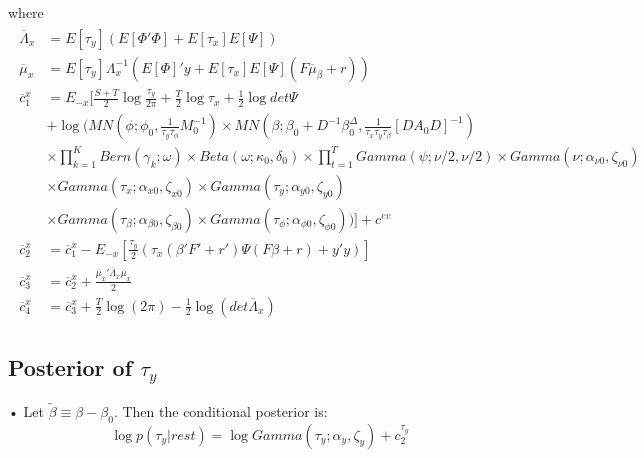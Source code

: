 \documentclass[11pt]{article}
\begin{document}
where
\begin{align*}
\begin{split}
	\overline{\Lambda}_{x}	&=	E\left[\tau_{y}\right]\left(E\left[\Phi'\Phi\right]+E\left[\tau_{x}\right]E\left[\Psi\right]\right)\\
	\overline{\mu}_{x}		&=	E\left[\tau_{y}\right]\Lambda_{x}^{-1}\left(E\left[\Phi\right]'y+E\left[\tau_{x}\right]E\left[\Psi\right]\left(F\overline{\mu}_{\beta}+r\right)\right)\\
	\overline{c}_{1}^{x}		&=	E_{-x}\Bigg[\frac{S+T}{2}\log\frac{\tau_{y}}{2\pi}+\frac{T}{2}\log\tau_{x}+\frac{1}{2}\log det\Psi\\
						&+\log\Bigg(MN\left(\phi;\phi_{0},\frac{1}{\tau_{y}\tau_{\phi}}M_{0}^{-1}\right)\times MN\left(\beta;\beta_{0}+D^{-1}\beta_{0}^{\Delta},\frac{1}{\tau_{x}\tau_{y}\tau_{\beta}}\left[DA_{0}D\right]^{-1}\right)\\
						&\times\prod_{k=1}^{K}Bern\left(\gamma_{k};\omega\right)\times Beta\left(\omega;\kappa_{0},\delta_{0}\right)\times\prod_{t=1}^{T}Gamma\left(\psi;\nu/2,\nu/2\right)\times Gamma\left(\nu;\alpha_{\nu0},\zeta_{\nu0}\right)\\
						&\times Gamma\left(\tau_{x};\alpha_{x0},\zeta_{x0}\right)\times Gamma\left(\tau_{y};\alpha_{y0},\zeta_{y0}\right)\\
						&\times Gamma\left(\tau_{\beta};\alpha_{\beta0},\zeta_{\beta0}\right)\times Gamma\left(\tau_{\phi};\alpha_{\phi0},\zeta_{\phi0}\right)\Bigg)\Bigg]+c^{ev}\\
	\overline{c}_{2}^{x}		&=	\overline{c}_{1}^{x}-E_{-x}\left[\frac{\tau_{y}}{2}\left(\tau_{x}\left(\beta'F'+r'\right)\Psi\left(F\beta+r\right)+y'y\right)\right]\\
	\overline{c}_{3}^{x}		&=	\overline{c}_{2}^{x}+\frac{\overline{\mu}_{x}'\overline{\Lambda}_{x}\overline{\mu}_{x}}{2}\\
	\overline{c}_{4}^{x}		&=\overline{c}_{3}^{x}+\frac{T}{2}\log\left(2\pi\right)-\frac{1}{2}\log\left(det\overline{\Lambda}_{x}\right)
\end{split}
\end{align*}

\subsection{Posterior of $\tau_y$}
• Let $\tilde{\beta}\equiv\beta-\beta_{0}$. Then the conditional posterior is: 
\begin{equation}
	\log p\left(\tau_{y}|rest\right) = \log Gamma\left(\tau_{y};\alpha_{y},\zeta_{y}\right)+c_{2}^{\tau_{y}}
\end{equation}
\end{document}
